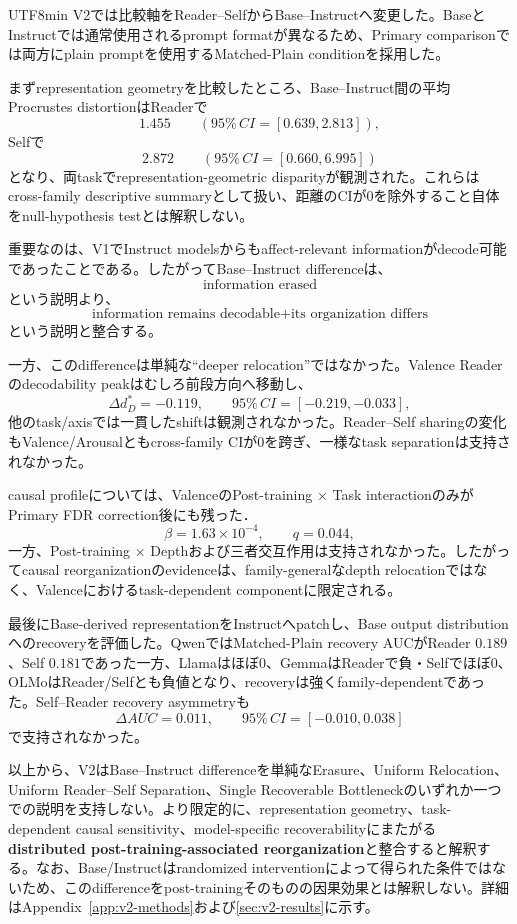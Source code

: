 \documentclass{article} %
\begin{document}
\begin{CJK*}{UTF8}{min}
V2では比較軸をReader--SelfからBase--Instructへ変更した。BaseとInstructでは通常使用されるprompt formatが異なるため、Primary comparisonでは両方にplain promptを使用するMatched-Plain conditionを採用した。

まずrepresentation geometryを比較したところ、Base--Instruct間の平均Procrustes distortionはReaderで
\[
1.455
\qquad
(95\%\,CI=[0.639,2.813]),
\]
Selfで
\[
2.872
\qquad
(95\%\,CI=[0.660,6.995])
\]
となり、両taskでrepresentation-geometric disparityが観測された。これらはcross-family descriptive summaryとして扱い、距離のCIが0を除外すること自体をnull-hypothesis testとは解釈しない。

重要なのは、V1でInstruct modelsからもaffect-relevant informationがdecode可能であったことである。したがってBase--Instruct differenceは、
\[
\text{information erased}
\]
という説明より、
\[
\text{information remains decodable}
+
\text{its organization differs}
\]
という説明と整合する。

一方、このdifferenceは単純な``deeper relocation''ではなかった。Valence Readerのdecodability peakはむしろ前段方向へ移動し、
\[
\Delta d_D^*=-0.119,
\qquad
95\%\,CI=[-0.219,-0.033],
\]
他のtask/axisでは一貫したshiftは観測されなかった。Reader--Self sharingの変化もValence/Arousalともcross-family CIが0を跨ぎ、一様なtask separationは支持されなかった。

causal profileについては、ValenceのPost-training $\times$ Task interactionのみがPrimary FDR correction後にも残った．
\[
\beta=1.63\times10^{-4},
\qquad
q=0.044,
\]
一方、Post-training $\times$ Depthおよび三者交互作用は支持されなかった。したがってcausal reorganizationのevidenceは、family-generalなdepth relocationではなく、Valenceにおけるtask-dependent componentに限定される。

最後にBase-derived representationをInstructへpatchし、Base output distributionへのrecoveryを評価した。QwenではMatched-Plain recovery AUCがReader $0.189$、Self $0.181$であった一方、Llamaはほぼ0、GemmaはReaderで負・Selfでほぼ0、OLMoはReader/Selfとも負値となり、recoveryは強くfamily-dependentであった。Self--Reader recovery asymmetryも
\[
\Delta AUC=0.011,
\qquad
95\%\,CI=[-0.010,0.038]
\]
で支持されなかった。

以上から、V2はBase--Instruct differenceを単純なErasure、Uniform Relocation、Uniform Reader--Self Separation、Single Recoverable Bottleneckのいずれか一つでの説明を支持しない。より限定的に、representation geometry、task-dependent causal sensitivity、model-specific recoverabilityにまたがる\textbf{distributed post-training-associated reorganization}と整合すると解釈する。なお、Base/Instructはrandomized interventionによって得られた条件ではないため、このdifferenceをpost-trainingそのものの因果効果とは解釈しない。詳細はAppendix~\ref{app:v2-methods}および\ref{sec:v2-results}に示す。



\end{CJK*}
\end{document}
